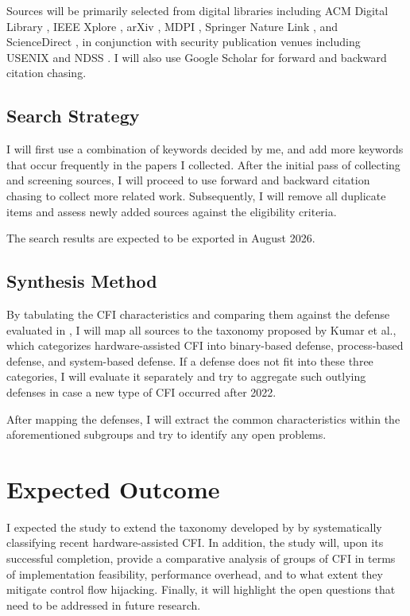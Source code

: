 \documentclass[journal,onecolumn]{IEEEtran}
\begin{document}
Sources will be primarily selected from digital libraries including ACM Digital Library \cite{ACMDLib}, IEEE Xplore \cite{IEEEXplore}, arXiv \cite{arXiv}, MDPI \cite{MDPI}, Springer Nature Link \cite{SpringerNature}, and ScienceDirect \cite{ScienceDirect}, in conjunction with security publication venues including USENIX \cite{USENIX} and NDSS \cite{NDSS}. I will also use Google Scholar \cite{GoogleScholar} for forward and backward citation chasing.

\subsection{Search Strategy}

I will first use a combination of keywords decided by me, and add more keywords that occur frequently in the papers I collected. After the initial pass of collecting and screening sources, I will proceed to use forward and backward citation chasing to collect more related work. Subsequently, I will remove all duplicate items and assess newly added sources against the eligibility criteria.

The search results are expected to be exported in August 2026.

\subsection{Synthesis Method}

By tabulating the CFI characteristics and comparing them against the defense evaluated in \cite{Kumar22}, I will map all sources to the taxonomy proposed by Kumar et al., which categorizes hardware-assisted CFI into binary-based defense, process-based defense, and system-based defense. If a defense does not fit into these three categories, I will evaluate it separately and try to aggregate such outlying defenses in case a new type of CFI occurred after 2022.

After mapping the defenses, I will extract the common characteristics within the aforementioned subgroups and try to identify any open problems.

\section{Expected Outcome}

I expected the study to extend the taxonomy developed by \cite{Kumar22} by systematically classifying recent hardware-assisted CFI. In addition, the study will, upon its successful completion, provide a comparative analysis of groups of CFI in terms of implementation feasibility, performance overhead, and to what extent they mitigate control flow hijacking. Finally, it will highlight the open questions that need to be addressed in future research.
\end{document}
